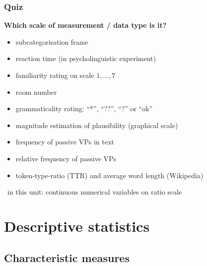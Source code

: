 \documentclass[t]{beamer} %
\begin{document}
\begin{frame}
  \frametitle{Quiz}

  \onslide<+->
  \textbf{Which scale of measurement / data type is it?}
  
  \begin{itemize}
  \item<+-> subcategorisation frame
  \item<+-> reaction time (in psycholinguistic experiment)
  \item<+-> familiarity rating on scale $1, \ldots, 7$
  \item<+-> room number
  \item<+-> grammaticality rating: ``*'', ``??'', ``?'' or ``ok''
  \item<+-> magnitude estimation of plausibility (graphical scale)
  \item<+-> frequency of passive VPs in text 
  \item<+-> relative frequency of passive VPs
  \item<+-> token-type-ratio (TTR) and average word length (Wikipedia)
  \end{itemize}

  \onslide<+->\gap
  \hand\ in this unit: continuous numerical variables on ratio scale
\end{frame}

\section{Descriptive statistics}

\subsection{Characteristic measures}
\end{document}
